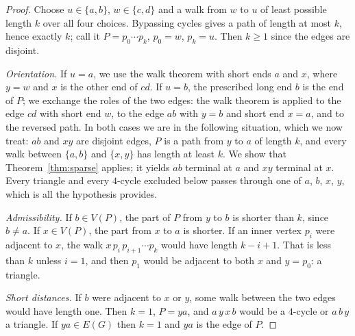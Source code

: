 \documentclass[11pt]{amsart}
\theoremstyle{definition}
\begin{document}
\begin{proof}
Choose $u\in\{a,b\}$, $w\in\{c,d\}$ and a walk from $w$ to $u$ of least possible length $k$ over
all four choices. Bypassing cycles gives a path of length at most $k$, hence exactly $k$; call it
$P=p_0\cdots p_k$, $p_0=w$, $p_k=u$. Then $k\ge1$ since the edges are disjoint.

\emph{Orientation.} If $u=a$, we use the walk theorem with short ends $a$ and $x$, where $y=w$ and
$x$ is the other end of $cd$. If $u=b$, the prescribed long end $b$ is the end of $P$; we
exchange the roles of the two edges: the walk theorem is applied to the edge $cd$ with short end
$w$, to the edge $ab$ with $y=b$ and short end $x=a$, and to the reversed path. In both cases we
are in the following situation, which we now treat: $ab$ and $xy$ are disjoint edges, $P$ is a
path from $y$ to $a$ of length $k$, and every walk between $\{a,b\}$ and $\{x,y\}$ has length at
least $k$. We show that Theorem~\ref{thm:sparse} applies; it yields $ab$ terminal at $a$ and $xy$
terminal at $x$. Every triangle and every $4$-cycle excluded below passes through one of $a$, $b$,
$x$, $y$, which is all the hypothesis provides.

\emph{Admissibility.} If $b\in V(P)$, the part of $P$ from $y$ to $b$ is shorter than $k$, since
$b\ne a$. If $x\in V(P)$, the part from $x$ to $a$ is shorter. If an inner vertex $p_i$ were
adjacent to $x$, the walk $x\,p_i\,p_{i+1}\cdots p_k$ would have length $k-i+1$. That is less than
$k$ unless $i=1$, and then $p_1$ would be adjacent to both $x$ and $y=p_0$: a triangle.

\emph{Short distances.} If $b$ were adjacent to $x$ or $y$, some walk between the two edges would
have length one. Then $k=1$, $P=ya$, and $a\,y\,x\,b$ would be a $4$-cycle or $a\,b\,y$ a
triangle. If $ya\in E(G)$ then $k=1$ and $ya$ is the edge of $P$.


\end{proof}
\end{document}
